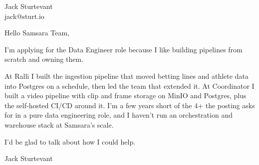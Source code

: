 \documentclass[11pt]{article}
\begin{document}
\raggedright

{\namefont\fontsize{20pt}{24pt}\selectfont Jack Sturtevant}\\[-0.3em]
jack@sturt.io

\vspace{1.2em}

Hello Samsara Team,

I'm applying for the Data Engineer role because I like building pipelines from scratch and owning them.

At Ralli I built the ingestion pipeline that moved betting lines and athlete data into Postgres on a schedule, then led the team that extended it. At Coordinator I built a video pipeline with clip and frame storage on MinIO and Postgres, plus the self-hosted CI/CD around it. I'm a few years short of the 4+ the posting asks for in a pure data engineering role, and I haven't run an orchestration and warehouse stack at Samsara's scale.

I'd be glad to talk about how I could help.

\vspace{0.6em}
Jack Sturtevant
\end{document}

